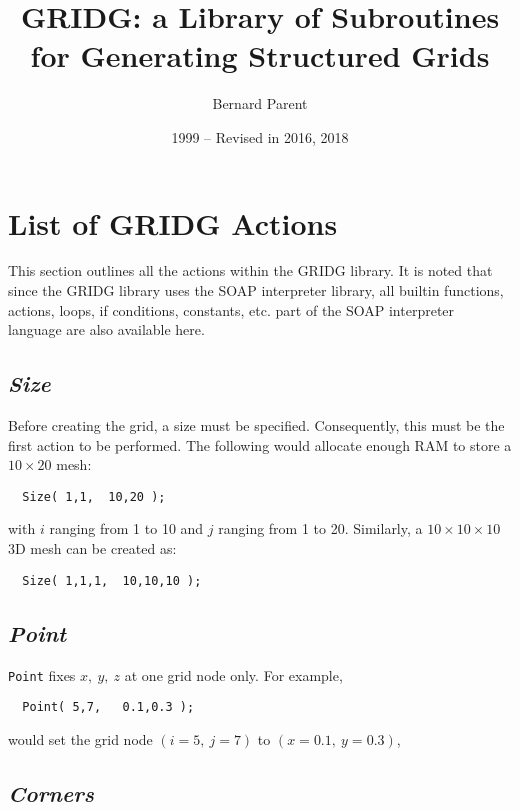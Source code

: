 \documentclass{warpdoc}
\author{
  Bernard Parent
}
\title{
  GRIDG: a Library of Subroutines for Generating Structured Grids 
}
\date{
  1999 -- Revised in 2016, 2018
}
\begin{document}
  \pagestyle{headings}
  \setcounter{page}{1}
  \makewarpdoctitle
  \tableofcontents




\sloppy

\section{List of GRIDG Actions}

This section outlines all the
actions within the GRIDG library. It is noted
that since the GRIDG library uses the SOAP interpreter library, all
builtin functions, actions, loops, if conditions, constants, etc.
part of the SOAP interpreter language are also available here.

\subsection{\emph{Size}}

Before creating the grid, a size must be specified.
Consequently, this must be the first action to be performed.
The following would allocate enough RAM to store a $10\times 20$
mesh:
%
\begin{verbatim}
  Size( 1,1,  10,20 );
\end{verbatim}
%
with $i$ ranging from 1 to 10 and $j$ ranging from 1 to 20. Similarly,
a $10 \times 10 \times 10$ 3D mesh can be created as:
%
\begin{verbatim}
  Size( 1,1,1,  10,10,10 );
\end{verbatim}
%

\subsection{\emph{Point}}

\verb|Point| fixes $x,~y,~z$ at one grid node only.
For example,
%
\begin{verbatim}
  Point( 5,7,   0.1,0.3 );
\end{verbatim}
%
would set the grid node $\left( i=5,~j=7 \right)$ to $\left( x=0.1,~y=0.3\right)$,

\subsection{\emph{Corners}}
\end{document}

